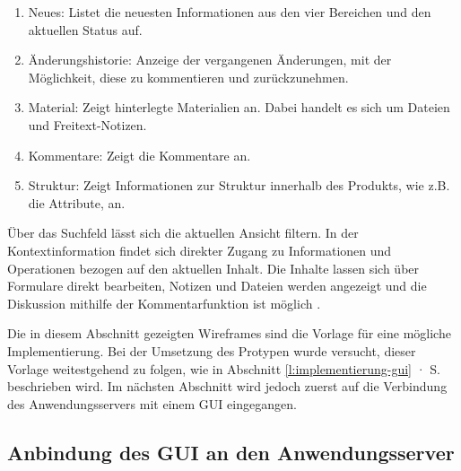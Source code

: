 \begin{enumerate}\itemsep -5pt
\item Neues: Listet die neuesten Informationen aus den vier Bereichen und den aktuellen Status auf.
\item Änderungshistorie: Anzeige der vergangenen Änderungen, mit der Möglichkeit, diese zu kommentieren und zurückzunehmen.
\item Material: Zeigt hinterlegte Materialien an. Dabei handelt es sich um Dateien und Freitext-Notizen.
\item Kommentare: Zeigt die Kommentare an.
\item Struktur: Zeigt Informationen zur Struktur innerhalb des Produkts, wie z.B. die Attribute, an.
\end{enumerate}

Über das Suchfeld  lässt sich die aktuellen Ansicht filtern. In der Kontextinformation findet sich direkter Zugang zu Informationen und Operationen bezogen auf den aktuellen Inhalt. Die Inhalte lassen sich über Formulare  direkt bearbeiten, Notizen und Dateien werden angezeigt  und die Diskussion mithilfe der Kommentarfunktion ist möglich .

\pagebreak

\secbar

Die in diesem Abschnitt gezeigten Wireframes sind die Vorlage für eine mögliche Implementierung. Bei der Umsetzung des Protypen wurde versucht, dieser Vorlage weitestgehend zu folgen, wie in Abschnitt \ref{l:implementierung-gui} · S.\pageref{l:implementierung-gui} beschrieben wird. Im nächsten Abschnitt wird jedoch zuerst auf die Verbindung des Anwendungsservers mit einem GUI eingegangen.

\pagebreak

\subsection{Anbindung des GUI an den Anwendungsserver}\label{l:anbindung-gui}


